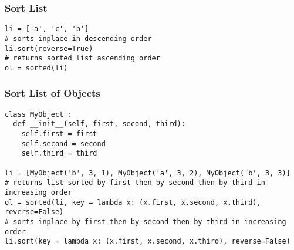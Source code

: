 \documentclass[twoside]{article}
\begin{document}
\begin{multicols*}{2}
{\subsubsection*{Sort List}
}
\begin{verbatim}
li = ['a', 'c', 'b']
# sorts inplace in descending order
li.sort(reverse=True)
# returns sorted list ascending order
ol = sorted(li)
\end{verbatim}

{
\subsubsection*{Sort List of Objects}
}
\begin{verbatim}
class MyObject :
  def __init__(self, first, second, third):
    self.first = first
    self.second = second
    self.third = third

li = [MyObject('b', 3, 1), MyObject('a', 3, 2), MyObject('b', 3, 3)]
# returns list sorted by first then by second then by third in increasing order
ol = sorted(li, key = lambda x: (x.first, x.second, x.third), reverse=False)
# sorts inplace by first then by second then by third in increasing order
li.sort(key = lambda x: (x.first, x.second, x.third), reverse=False)
\end{verbatim}

\end{multicols*}
\end{document}
